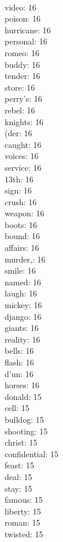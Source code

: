 \begin{multicols}{6}
  \\ video: 16
  \\ poison: 16
  \\ hurricane: 16
  \\ personal: 16
  \\ romeo: 16
  \\ buddy: 16
  \\ tender: 16
  \\ store: 16
  \\ perry's: 16
  \\ rebel: 16
  \\ knights: 16
  \\ (der: 16
  \\ caught: 16
  \\ voices: 16
  \\ service: 16
  \\ 13th: 16
  \\ sign: 16
  \\ crush: 16
  \\ weapon: 16
  \\ boots: 16
  \\ bound: 16
  \\ affairs: 16
  \\ murder,: 16
  \\ smile: 16
  \\ named: 16
  \\ laugh: 16
  \\ mickey: 16
  \\ django: 16
  \\ giants: 16
  \\ reality: 16
  \\ bells: 16
  \\ flash: 16
  \\ d'un: 16
  \\ horses: 16
  \\ donald: 15
  \\ cell: 15
  \\ bulldog: 15
  \\ shooting: 15
  \\ christ: 15
  \\ confidential: 15
  \\ feast: 15
  \\ deal: 15
  \\ stay: 15
  \\ famous: 15
  \\ liberty: 15
  \\ roman: 15
  \\ twisted: 15

\end{multicols}
